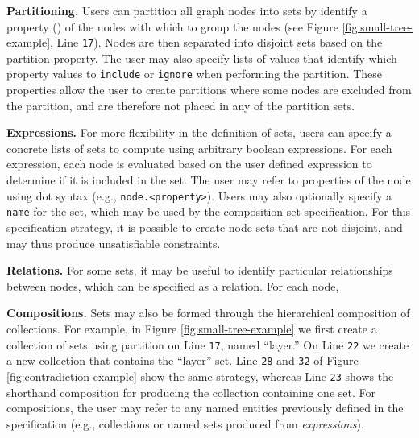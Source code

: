
\textbf{Partitioning.} Users can partition all graph nodes into sets by
identify a property () of the nodes
with which to group the nodes (see Figure \ref{fig:small-tree-example},
Line \texttt{17}). Nodes are then separated into disjoint sets based on the
partition property. The user may also specify lists of values that identify
which property values to \texttt{include} or \texttt{ignore} when
performing the partition. These properties allow the user to create
partitions where some nodes are excluded from the partition, and are
therefore not placed in any of the partition sets.

\textbf{Expressions.} For more flexibility in the definition of sets, users
can specify a concrete lists of sets to compute using arbitrary boolean
expressions. For each expression, each node is evaluated based on the user
defined expression to determine if it is included in the set. The user may
refer to properties of the node using dot syntax (e.g.,
\texttt{node.<property>}). Users may also optionally specify a
\texttt{name} for the set, which may be used by the composition set
specification. For this specification strategy, it is possible to create
node sets that are not disjoint, and may thus produce unsatisfiable
constraints. 

\textbf{Relations.} For some sets, it may be useful to identify particular
relationships between nodes, which can be specified as a relation. For each
node, 

\contradictionExample

\textbf{Compositions.} Sets may also be formed through the hierarchical
composition of collections. For example, in Figure
\ref{fig:small-tree-example} we first create a collection of sets using
partition on Line \texttt{17}, named ``layer.'' On Line \texttt{22} we
create a new collection that contains the ``layer'' set. Line \texttt{28}
and \texttt{32} of Figure \ref{fig:contradiction-example} show the same
strategy, whereas Line \texttt{23} shows the shorthand composition for
producing the collection containing one set. For compositions, the user may
refer to any named entities previously defined in the specification (e.g.,
collections or named sets produced from \emph{expressions}).


